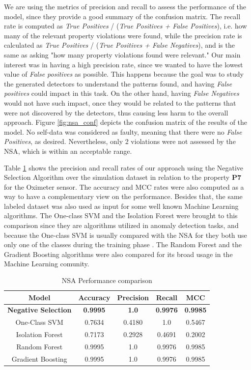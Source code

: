 We are using the metrics of precision and recall to assess the performance of the model, since they provide a good summary of the confusion matrix. The recall rate is computed as \textit{True Positives} / (\textit{True Positives + False Positives}), i.e. how many of the relevant property violations were found, while the precision rate is calculated as \textit{True Positives} / (\textit{True Positives + False Negatives}), and is the same as asking "how many property violations found were relevant." Our main interest was in having a high precision rate, since we wanted to have the lowest value of \textit{False positives} as possible. This happens because the goal was to study the generated detectors to understand the patterns found, and having \textit{False positives} could impact in this task. On the other hand, having \textit{False Negatives} would not have such impact, once they would be related to the patterns that were not discovered by the detectors, thus causing less harm to the overall approach. Figure \ref{fig:nsa_conf} depicts the confusion matrix of the results of the model. No self-data was considered as faulty, meaning that there were no \textit{False Positives}, as desired. Nevertheless, only 2 violations were not assessed by the NSA, which is within an acceptable range.


Table \ref{tab:ev_comparison} shows the precision and recall rates of our approach using the Negative Selection Algorithm over the simulation dataset in relation to the property \textbf{P7} for the Oximeter sensor. The accuracy and MCC rates were also computed as a way to have a complementary view on the performance. Besides that, the same labeled dataset was also used as input for some well known Machine Learning algorithms. The One-class SVM and the Isolation Forest were brought to this comparison since they are algorithms utilized in anomaly detection tasks, and because the One-class SVM is usually compared with the NSA for they both use only one of the classes during the training phase \cite{NSAResearch2021}. The Random Forest and the Gradient Boosting algorithms were also compared for its broad usage in the Machine Learning comunity. 

\begin{table}[!h]
    \centering
    \begin{tabular}{ccccc}
    \hline
    Model              & Accuracy & Precision & Recall & MCC    \\ \hline
    \textbf{Negative Selection} & \textbf{0.9995}   & \textbf{1.0}       & \textbf{0.9976} & \textbf{0.9985} \\
    One-Class SVM      & 0.7634   & 0.4180    & 1.0    & 0.5467 \\
    Isolation Forest   & 0.7173   & 0.2928    & 0.4691 & 0.2002 \\
    Random Forest      & 0.9995   & 1.0       & 0.9976 & 0.9985 \\
    Gradient Boosting  & 0.9995   & 1.0       & 0.9976 & 0.9985 \\ \hline
    \end{tabular}
    \caption{NSA Performance comparison}
    \label{tab:ev_comparison}
\end{table}

